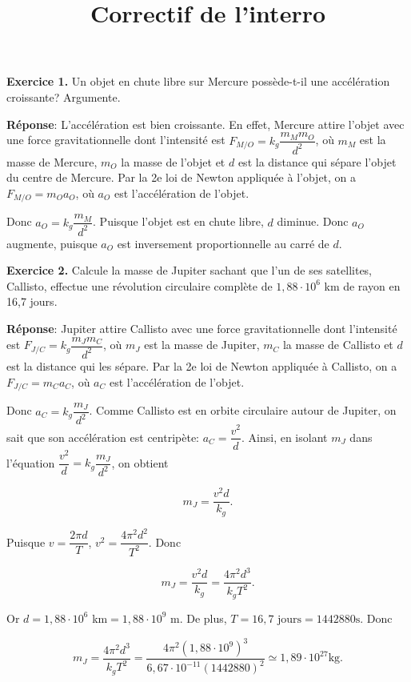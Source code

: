 \documentclass[
  letterpaper,
  DIV=11,
  numbers=noendperiod]{scrartcl}
\title{Correctif de l'interro}
\author{}
\date{}
\begin{document}
\maketitle


\textbf{Exercice 1.} Un objet en chute libre sur Mercure possède-t-il
une accélération croissante? Argumente.

\textbf{Réponse}: L'accélération est bien croissante. En effet, Mercure
attire l'objet avec une force gravitationnelle dont l'intensité est
\(F_{M/O}=k_g\dfrac{m_Mm_O}{d^2}\), où \(m_M\) est la masse de Mercure,
\(m_O\) la masse de l'objet et \(d\) est la distance qui sépare l'objet
du centre de Mercure. Par la 2e loi de Newton appliquée à l'objet, on a
\(F_{M/O}= m_O a_O\), où \(a_O\) est l'accélération de l'objet.

Donc \(a_O=k_g\dfrac{m_M}{d^2}\). Puisque l'objet est en chute libre,
\(d\) diminue. Donc \(a_O\) augmente, puisque \(a_O\) est inversement
proportionnelle au carré de \(d\).

\textbf{Exercice 2.} Calcule la masse de Jupiter sachant que l'un de ses
satellites, Callisto, effectue une révolution circulaire complète de
\(1,88\cdot 10^6\) km de rayon en 16,7 jours.

\textbf{Réponse}: Jupiter attire Callisto avec une force
gravitationnelle dont l'intensité est
\(F_{J/C}=k_g\dfrac{m_Jm_C}{d^2}\), où \(m_J\) est la masse de Jupiter,
\(m_C\) la masse de Callisto et \(d\) est la distance qui les sépare.
Par la 2e loi de Newton appliquée à Callisto, on a \(F_{J/C}= m_C a_C\),
où \(a_C\) est l'accélération de l'objet.

Donc \(a_C=k_g\dfrac{m_J}{d^2}\). Comme Callisto est en orbite
circulaire autour de Jupiter, on sait que son accélération est
centripète: \(a_C=\dfrac{v^2}{d}\). Ainsi, en isolant \(m_J\) dans
l'équation \(\dfrac{v^2}{d}=k_g\dfrac{m_J}{d^2}\), on obtient

\[ m_J = \dfrac{v^2d}{k_g}.\]

Puisque \(v=\dfrac{2\pi d}{T}\), \(v^2=\dfrac{4\pi^2 d^2}{T^2}\). Donc

\[ m_J = \dfrac{v^2d}{k_g}=\dfrac{4\pi^2 d^3}{k_g T^2}.\]

Or \(d=1,88\cdot 10^6\) km\(=1,88\cdot 10^9\) m. De plus,
\(T=16,7\text{ jours}=1442880\text{s}\). Donc

\[ m_J= \dfrac{4\pi^2 d^3}{k_g T^2}=\dfrac{4\pi^2(1,88\cdot 10^9)^3}{6,67\cdot 10^{-11}(1442880)^2}\simeq 1,89\cdot 10^{27}\text{kg}.\]
\end{document}
